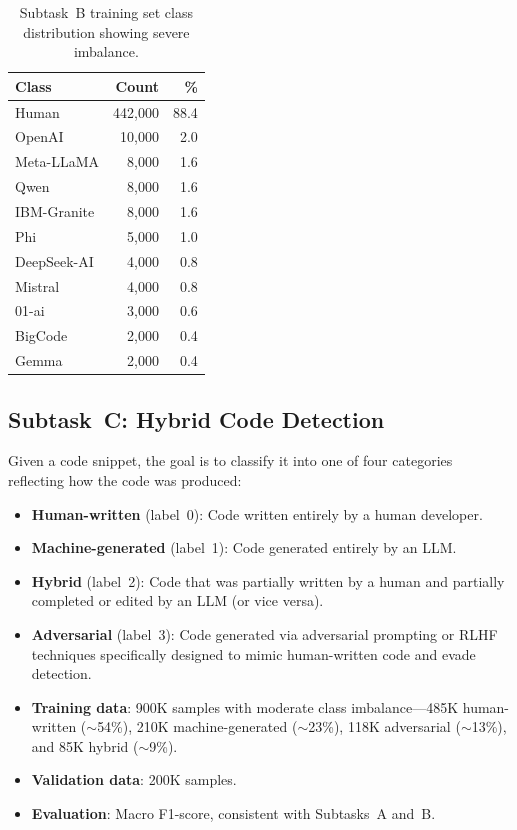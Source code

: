 \documentclass[11pt]{article}
\begin{document}
\begin{table}[ht]
\centering
\small
\begin{tabularx}{\columnwidth}{@{}l r r@{}}
\toprule
\textbf{Class} & \textbf{Count} & \textbf{\%} \\ \midrule
Human & 442,000 & 88.4 \\
OpenAI & 10,000 & 2.0 \\
Meta-LLaMA & 8,000 & 1.6 \\
Qwen & 8,000 & 1.6 \\
IBM-Granite & 8,000 & 1.6 \\
Phi & 5,000 & 1.0 \\
DeepSeek-AI & 4,000 & 0.8 \\
Mistral & 4,000 & 0.8 \\
01-ai & 3,000 & 0.6 \\
BigCode & 2,000 & 0.4 \\
Gemma & 2,000 & 0.4 \\ \bottomrule
\end{tabularx}
\caption{Subtask~B training set class distribution showing severe imbalance.}
\label{tab:taskB_dist}
\end{table}

\subsection{Subtask~C: Hybrid Code Detection}

Given a code snippet, the goal is to classify it into one of four categories reflecting how the code was produced:

\begin{itemize}
    \item \textbf{Human-written} (label~0): Code written entirely by a human developer.
    \item \textbf{Machine-generated} (label~1): Code generated entirely by an LLM.
    \item \textbf{Hybrid} (label~2): Code that was partially written by a human and partially completed or edited by an LLM (or vice versa).
    \item \textbf{Adversarial} (label~3): Code generated via adversarial prompting or RLHF techniques specifically designed to mimic human-written code and evade detection.
\end{itemize}

\begin{itemize}
    \item \textbf{Training data}: 900K samples with moderate class imbalance---485K human-written ($\sim$54\%), 210K machine-generated ($\sim$23\%), 118K adversarial ($\sim$13\%), and 85K hybrid ($\sim$9\%).
    \item \textbf{Validation data}: 200K samples.
    \item \textbf{Evaluation}: Macro F1-score, consistent with Subtasks~A and~B.
\end{itemize}
\end{document}
